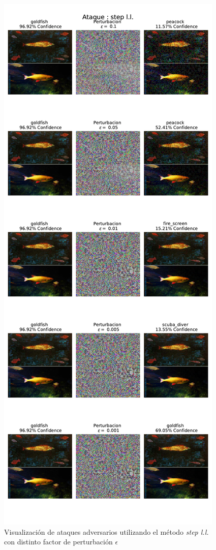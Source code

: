 \documentclass[conference]{IEEEtran}
\begin{document}
\begin{figure}[!tp]
    \centering
    \includegraphics[width=\linewidth]{adv_2.pdf}
    \caption{Visualización de ataques adversarios utilizando el método \textit{step l.l.} con distinto factor de perturbación $\epsilon$ }
    \label{adv_comparison}
\end{figure}
\end{document}

